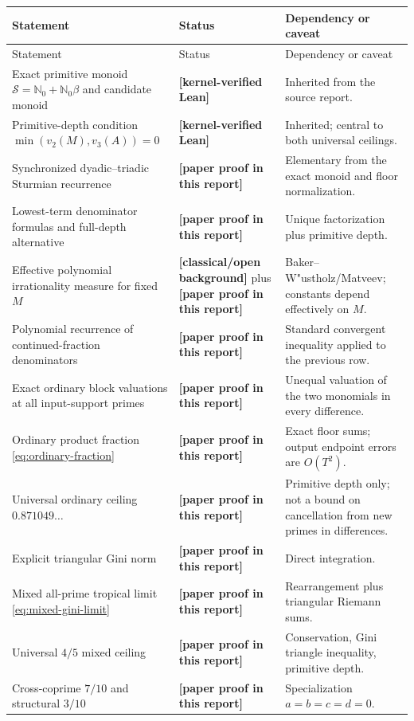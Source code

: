 \documentclass[11pt,oneside]{article}
\theoremstyle{definition}
\theoremstyle{remark}
\newcommand{\Nzero}{\mathbb N_0}
\newcommand{\Sol}{\mathcal S}
\newcommand{\statuslean}{\textcolor{leanblue}{\textbf{[kernel-verified Lean]}}}
\newcommand{\statusnew}{\textcolor{newgreen}{\textbf{[paper proof in this report]}}}
\newcommand{\statusknown}{\textcolor{classicalgray}{\textbf{[classical/\allowbreak open background]}}}
\begin{document}
\begin{longtable}{@{}>{\raggedright\arraybackslash}p{}>{\raggedright\arraybackslash}p{}>{\raggedright\arraybackslash}p{}@{}}
\toprule
Statement & Status & Dependency or caveat \\
\midrule
\endfirsthead
\toprule
Statement & Status & Dependency or caveat \\
\midrule
\endhead
Exact primitive monoid $\Sol=\Nzero+\Nzero\beta$ and candidate monoid & \statuslean & Inherited from the source report. \\
\addlinespace
Primitive-depth condition $\min(v_2(M),v_3(A))=0$ & \statuslean & Inherited; central to both universal ceilings. \\
\addlinespace
Synchronized dyadic--triadic Sturmian recurrence & \statusnew & Elementary from the exact monoid and floor normalization. \\
\addlinespace
Lowest-term denominator formulas and full-depth alternative & \statusnew & Unique factorization plus primitive depth. \\
\addlinespace
Effective polynomial irrationality measure for fixed $M$ & \statusknown{} plus \statusnew & Baker--W"ustholz/Matveev; constants depend effectively on $M$. \\
\addlinespace
Polynomial recurrence of continued-fraction denominators & \statusnew & Standard convergent inequality applied to the previous row. \\
\addlinespace
Exact ordinary block valuations at all input-support primes & \statusnew & Unequal valuation of the two monomials in every difference. \\
\addlinespace
Ordinary product fraction \eqref{eq:ordinary-fraction} & \statusnew & Exact floor sums; output endpoint errors are $O(T^2)$. \\
\addlinespace
Universal ordinary ceiling $0.871049\ldots$ & \statusnew & Primitive depth only; not a bound on cancellation from new primes in differences. \\
\addlinespace
Explicit triangular Gini norm & \statusnew & Direct integration. \\
\addlinespace
Mixed all-prime tropical limit \eqref{eq:mixed-gini-limit} & \statusnew & Rearrangement plus triangular Riemann sums. \\
\addlinespace
Universal $4/5$ mixed ceiling & \statusnew & Conservation, Gini triangle inequality, primitive depth. \\
\addlinespace
Cross-coprime $7/10$ and structural $3/10$ & \statusnew & Specialization $a=b=c=d=0$. \\

\end{longtable}
\end{document}
